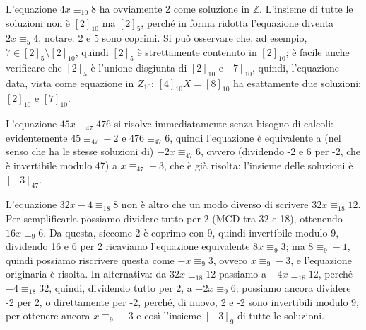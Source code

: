 \begin{example}
	L'equazione $4x \equiv_{10} 8$ ha ovviamente 2 come soluzione in $\mathbb{Z}$. L’insieme di tutte le soluzioni non è $[2]_10$ ma $[2]_5$, perché in
	forma ridotta l’equazione diventa $2x \equiv_{5} 4$, notare: 2 e 5 sono coprimi. Si può osservare che, ad esempio, $7 \in [2]_{5} \setminus [2]_{10}$, quindi $[2]_{5}$ è strettamente contenuto in $[2]_{10}$; è facile anche verificare che $[2]_{5}$ è l’unione disgiunta di $[2]_{10}$ e $[7]_{10}$, quindi, l’equazione data, vista come equazione in $Z_{10}$: $[4]_{10} X = [8]_{10}$ ha esattamente due soluzioni: $[2]_{10}$ e $[7]_{10}$.
\end{example}

\begin{example}
	L’equazione $45x \equiv_{47} 476$ si risolve immediatamente senza bisogno di calcoli: evidentemente $45 \equiv_{47} -2$ e $476 \equiv_{47} 6$, quindi l’equazione è equivalente a (nel senso che ha le stesse soluzioni di) $-2x \equiv_{47} 6$, ovvero (dividendo -2 e 6 per -2, che è invertibile modulo 47) a $x \equiv_{47} -3$, che è già risolta: l’insieme delle soluzioni è $[-3]_{47}$.
\end{example}

\begin{example}
	L’equazione $32x - 4 \equiv_{18} 8$ non è altro che un modo diverso di scrivere $32x \equiv_{18} 12$. Per semplificarla possiamo dividere tutto per 2 (MCD tra 32 e 18), ottenendo $16x \equiv_{9} 6$. Da questa, siccome 2 è coprimo con 9, quindi invertibile modulo 9, dividendo 16 e 6 per 2 ricaviamo l’equazione equivalente $8x \equiv_{9} 3$; ma $8 \equiv_{9} -1$, quindi possiamo
	riscrivere questa come $-x \equiv_{9} 3$, ovvero $x \equiv_{9} -3$, e l’equazione originaria è risolta. In alternativa: da $32x \equiv_{18} 12$
	passiamo a $-4x \equiv_{18} 12$, perché $-4 \equiv_{18} 32$, quindi, dividendo tutto per 2, a $-2x \equiv_{9} 6$; possiamo ancora dividere -2
	per 2, o direttamente per -2, perché, di nuovo, 2 e -2 sono invertibili modulo 9, per ottenere ancora $x \equiv_{9} -3$ e così l’insieme $[-3]_{9}$ di tutte le soluzioni.
\end{example}



